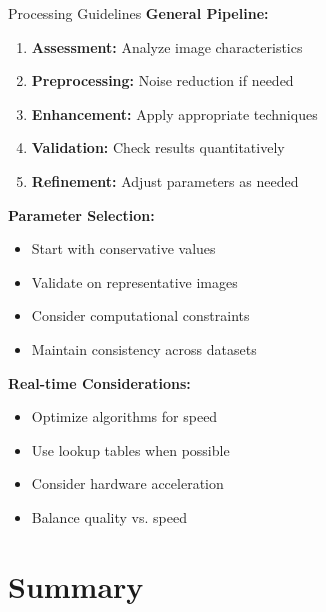\documentclass[aspectratio=169,10pt]{beamer}
\begin{document}
\begin{frame}{Processing Guidelines}
\textbf{General Pipeline:}
\begin{enumerate}
\item \textbf{Assessment:} Analyze image characteristics
\item \textbf{Preprocessing:} Noise reduction if needed
\item \textbf{Enhancement:} Apply appropriate techniques
\item \textbf{Validation:} Check results quantitatively
\item \textbf{Refinement:} Adjust parameters as needed
\end{enumerate}

\textbf{Parameter Selection:}
\begin{itemize}
\item Start with conservative values
\item Validate on representative images
\item Consider computational constraints
\item Maintain consistency across datasets
\end{itemize}

\textbf{Real-time Considerations:}
\begin{itemize}
\item Optimize algorithms for speed
\item Use lookup tables when possible
\item Consider hardware acceleration
\item Balance quality vs. speed
\end{itemize}
\end{frame}

\section{Summary}
\end{document}
